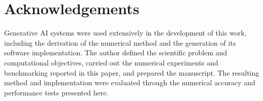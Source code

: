 \documentclass[letters,usenatbib,useAMS]{mnras}
\begin{document}
\section*{Acknowledgements}
Generative AI systems were used extensively in the development of this work, including the derivation of the numerical method and the generation of its software implementation. The author defined the scientific problem and computational objectives, carried out the numerical experiments and benchmarking reported in this paper, and prepared the manuscript. The resulting method and implementation were evaluated through the numerical accuracy and performance tests presented here.



{\footnotesize}

\bsp
\label{lastpage}
\end{document}
